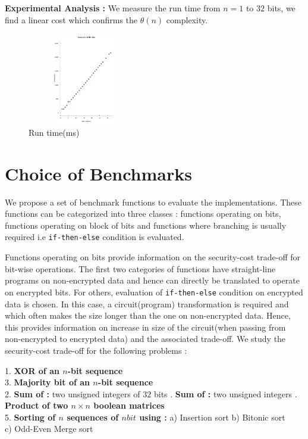 \documentclass{acm_proc_article-sp}
\begin{document}
\textbf{Experimental Analysis :} We measure the run time from $n=1$ to $32$ bits, we find a linear cost which confirms the $\theta(n)$ complexity.

\begin{figure}[!h] %
\centering
\includegraphics[width=5cm,height=4cm]{f2.pdf} 
\caption{Run time(ms)} 
\label{image_f2} %
\end{figure}

\section{Choice of Benchmarks}
\label{sec:bm}

We propose a set of benchmark functions to evaluate the implementations. These functions can be categorized into three classes : functions operating on bits, functions operating on block of bits and functions where branching is usually required i.e \texttt{if-then-else} condition is evaluated.

Functions operating on bits provide information on the security-cost trade-off for bit-wise operations. The first two categories of functions have straight-line programs on non-encrypted data and hence can directly be translated to operate on encrypted bits. For others, evaluation of \texttt{if-then-else} condition on encrypted data is chosen. In this case, a circuit(program) transformation is required and which often makes the size longer than the one on non-encrypted data. Hence, this provides information on increase in size of the circuit(when passing from non-encrypted to encrypted data) and the associated trade-off. We study the security-cost trade-off for the following problems : 

1. \textbf{XOR of an $n$-bit sequence}\\
3. \textbf{Majority bit of an $n$-bit sequence} \\
2. \textbf{Sum of :}  two unsigned integers of $32$ bits  . \textbf{Sum of :}  two unsigned integers  . \textbf{Product of two $n\times n$ boolean matrices} \\
5. \textbf{Sorting of $n$ sequences of $nbit$ using :} \newline\noindent
\phantom{x}\hspace{3ex} a) Insertion sort \phantom{x}\hspace{2ex} b) Bitonic sort \\
	\phantom{x}\hspace{3ex} 	     c) Odd-Even Merge sort 
\end{document}
